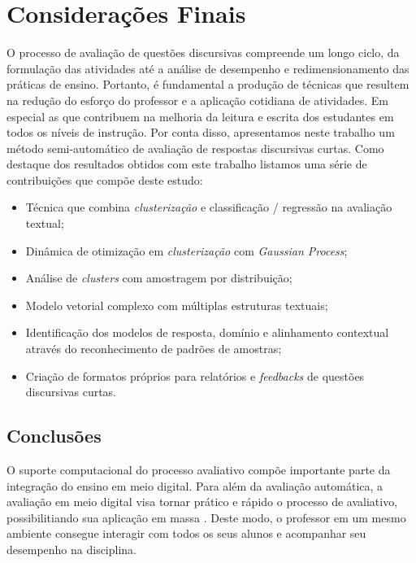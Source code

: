 \chapter{Considerações Finais}
\label{cap-conclusao}

O processo de avaliação de questões discursivas compreende um longo ciclo, da formulação das atividades até a análise de desempenho e redimensionamento das práticas de ensino. Portanto, é fundamental a produção de técnicas que resultem na redução do esforço do professor e a aplicação cotidiana de atividades. Em especial as que contribuem na melhoria da leitura e escrita dos estudantes em todos os níveis de instrução. Por conta disso, apresentamos neste trabalho um método semi-automático de avaliação de respostas discursivas curtas. Como destaque dos resultados obtidos com este trabalho listamos uma série de contribuições que compõe deste estudo:

\begin{itemize}
  \item Técnica que combina \textit{clusterização} e classificação / regressão na avaliação textual;
  \item Dinâmica de otimização em \textit{clusterização} com \textit{Gaussian Process};
  \item Análise de \textit{clusters} com amostragem por distribuição;
  \item Modelo vetorial complexo com múltiplas estruturas textuais;
  \item Identificação dos modelos de resposta, domínio e alinhamento contextual através do reconhecimento de padrões de amostras;
  \item Criação de formatos próprios para relatórios e \textit{feedbacks} de questões discursivas curtas.
\end{itemize}

\section{Conclusões}

O suporte computacional do processo avaliativo compõe importante parte da integração do ensino em meio digital. Para além da avaliação automática, a avaliação em meio digital visa tornar prático e rápido o processo de avaliativo, possibilitiando sua aplicação em massa \cite{romero2010}. Deste modo, o professor em um mesmo ambiente consegue interagir com todos os seus alunos e acompanhar seu desempenho na disciplina. 

